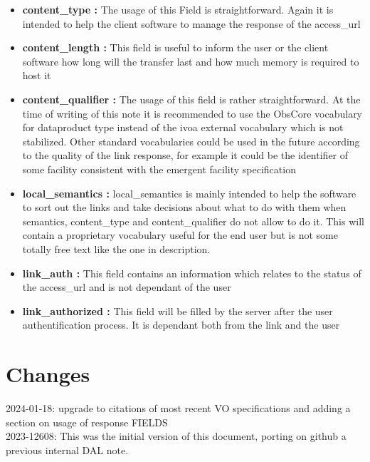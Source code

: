 \documentclass[11pt,a4paper]{ivoa}
\begin{document}
\begin{itemize}
\item \textbf{content\_type :} The usage of this Field is straightforward. Again it is intended
to help the client software to manage the response of the access\_url
\item \textbf{content\_length :} This field is useful to inform the user or the client 
software how long will the transfer last and how much memory is required to host it
\item \textbf{content\_qualifier :} The usage of this field is rather straightforward. At the 
time of writing of this note it is recommended to use the ObsCore vocabulary for dataproduct 
type instead of the ivoa external vocabulary which is not stabilized. Other standard vocabularies
could be used in the future according to the quality of the link response, for example it could 
be the identifier of some facility consistent with the emergent facility specification
\item \textbf{local\_semantics :} local\_semantics is mainly intended to help the software to sort out the links and take decisions about what to do with them when semantics, content\_type and content\_qualifier do not allow to do it. This will contain a proprietary vocabulary useful for the end user but is not some totally free text like the one in description.
\item \textbf{link\_auth :} This field contains an information which relates to the status of the access\_url and is not dependant of the user
\item \textbf{link\_authorized :} This field will be filled by the server after the user authentification process. It is dependant both from the link and the user
\end{itemize}


\section{Changes}

2024-01-18: upgrade to citations of most recent VO specifications and adding a section on usage of response FIELDS\\
2023-12608: This was the initial version of this document, porting on github a previous internal DAL note.



\end{document}
